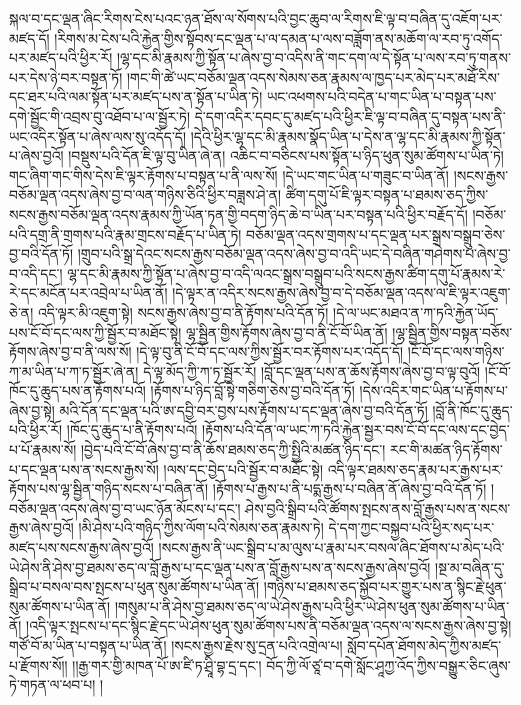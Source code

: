 སྐལ་བ་དང་ལྡན་ཞིང་རིགས་ངེས་པའང་ཉན་ཐོས་ལ་སོགས་པའི་བྱང་ཆུབ་ལ་རིགས་ཇི་ལྟ་བ་བཞིན་དུ་འཇོག་པར་མཛད་དོ། །རིགས་མ་ངེས་པའི་རྐྱེན་གྱིས་སྟོབས་དང་ལྡན་པ་ལ་དམན་པ་ལས་བཟློག་ནས་མཆོག་ལ་རབ་ཏུ་འགོད་པར་མཛད་པའི་ཕྱིར་རོ། །ལྷ་དང་མི་རྣམས་ཀྱི་སྟོན་པ་ཞེས་བྱ་བ་འདིས་ནི་གང་དག་ལ་དེ་སྟོན་པ་ལས་རབ་ཏུ་གནས་པར་དེས་ཉེ་བར་བསྟན་ཏོ། །གང་གི་ཚེ་ཡང་བཅོམ་ལྡན་འདས་སེམས་ཅན་རྣམས་ལ་ཁྱད་པར་མེད་པར་མཐོ་རིས་དང་ཐར་པའི་ལམ་སྟོན་པར་མཛད་པས་ན་སྟོན་པ་ཡིན་ཏེ། ཡང་འཕགས་པའི་བདེན་པ་གང་ཡིན་པ་བསྟན་པས་དགེ་སྦྱོང་གི་འབྲས་བུ་འཐོབ་པ་ལ་སྦྱོར་ཏེ། དེ་དག་འདིར་དབང་དུ་མཛད་པའི་ཕྱིར་ཇི་ལྟ་བ་བཞིན་དུ་བསྟན་པས་ནི་ཡང་འདིར་སྟོན་པ་ཞེས་ལས་སུ་འདོད་དོ། །དེའི་ཕྱིར་ལྷ་དང་མི་རྣམས་སྣོད་ཡིན་པ་དེས་ན་ལྷ་དང་མི་རྣམས་ཀྱི་སྟོན་པ་ཞེས་བྱའོ། །བསྡུས་པའི་དོན་ཇི་ལྟ་བུ་ཡིན་ཞེ་ན། འཆིང་བ་བཅིངས་པས་སྟོན་པ་ཉིད་ཕུན་སུམ་ཚོགས་པ་ཡིན་ཏེ། གང་ཞིག་གང་གིས་དེས་ཇི་ལྟར་རྟོགས་པ་བསྟན་པ་ནི་ལས་སོ། །དེ་ཡང་གང་ཡིན་པ་གཟུང་བ་ཡིན་ནོ། །སངས་རྒྱས་བཅོམ་ལྡན་འདས་ཞེས་བྱ་བ་ལན་གཉིས་ཅིའི་ཕྱིར་བཟླས་ཤེ་ན། ཚིག་དགུ་པོ་ཇི་ལྟར་བསྟན་པ་ཐམས་ཅད་ཀྱིས་སངས་རྒྱས་བཅོམ་ལྡན་འདས་རྣམས་ཀྱི་ཡོན་ཏན་གྱི་བདག་ཉིད་ཆེ་བ་ཡིན་པར་བསྟན་པའི་ཕྱིར་བརྗོད་དོ། །བཅོམ་པའི་དགྲ་ནི་གྲགས་པའི་རྣམ་གྲངས་བརྗོད་པ་ཡིན་ཏེ། བཅོམ་ལྡན་འདས་གྲགས་པ་དང་ལྡན་པར་སྒྲས་བསྒྲུབ་ཅེས་བྱ་བའི་དོན་ཏོ། །གྲུབ་པའི་སྒྲ་དེའང་སངས་རྒྱས་བཅོམ་ལྡན་འདས་ཞེས་བྱ་བ་འདི་ཡང་དེ་བཞིན་གཤེགས་པ་ཞེས་བྱ་བ་འདི་དང་། ལྷ་དང་མི་རྣམས་ཀྱི་སྟོན་པ་ཞེས་བྱ་བ་འདི་ལའང་སྒྲས་བསྒྲུབ་པའི་སངས་རྒྱས་ཚིག་དགུ་པོ་རྣམས་རེ་རེ་དང་མངོན་པར་འབྲེལ་པ་ཡིན་ནོ། །དེ་ལྟར་ན་འདིར་སངས་རྒྱས་ཞེས་བྱ་བ་དེ་བཅོམ་ལྡན་འདས་ལ་ཇི་ལྟར་འཇུག་ཅེ་ན། འདི་ལྟར་མི་འཇུག་སྟེ། སངས་རྒྱས་ཞེས་བྱ་བ་ནི་རྟོགས་པའི་དོན་ཏོ། །དེ་ལ་ཡང་མཐའ་ན་ཀ་ཏའི་རྐྱེན་ཡོད་པས་ངོ་བོ་དང་ལས་ཀྱི་སྦྱོར་བ་མཐོང་སྟེ། ལྷ་སྦྱིན་གྱིས་རྟོགས་ཞེས་བྱ་བ་ནི་ངོ་བོ་ཡིན་ནོ། །ལྷ་སྦྱིན་གྱིས་བསྟན་བཅོས་རྟོགས་ཞེས་བྱ་བ་ནི་ལས་སོ། །དེ་ལྟ་བུ་ནི་ངོ་བོ་དང་ལས་ཀྱིས་སྦྱོར་བར་རྟོགས་པར་འདོད་དོ། །ངོ་བོ་དང་ལས་གཉིས་ཀ་མ་ཡིན་པ་ཀ་ཏ་སྦྱོར་ཞེ་ན། དེ་ལྟ་མོད་ཀྱི་ཀ་ཏ་སྦྱོར་རོ། །བློ་དང་ལྡན་པས་ན་ཆོས་རྟོགས་ཞེས་བྱ་བ་ལྟ་བུའོ། །ངོ་བོ་ཁོང་དུ་ཆུད་པས་ན་རྟོགས་པའོ། །རྟོགས་པ་ཉིད་བློ་སྟེ་གཅིག་ཅེས་བྱ་བའི་དོན་ཏོ། །དེས་འདིར་གང་ཡིན་པ་རྟོགས་པ་ཞེས་བྱ་སྟེ། མའི་དོན་དང་ལྡན་པའི་ཨ་དབྱི་བར་བྱས་པས་རྟོགས་པ་དང་ལྡན་ཞེས་བྱ་བའི་དོན་ཏོ། །བློ་ནི་ཁོང་དུ་ཆུད་པའི་ཕྱིར་རོ། །ཁོང་དུ་ཆུད་པ་ནི་རྟོགས་པའོ། །རྟོགས་པའི་དོན་ལ་ཡང་ཀ་ཏའི་རྐྱེན་སྦྱར་བས་ངོ་བོ་དང་ལས་དང་བྱེད་པ་པོ་རྣམས་སོ། །བྱེད་པའི་ངོ་བོ་ཞེས་བྱ་བ་ནི་ཆོས་ཐམས་ཅད་ཀྱི་སྤྱིའི་མཚན་ཉིད་དང་། རང་གི་མཚན་ཉིད་རྟོགས་པ་དང་ལྡན་པས་ན་སངས་རྒྱས་སོ། །ལས་དང་བྱེད་པའི་སྦྱོར་བ་མཐོང་སྟེ། འདི་ལྟར་ཐམས་ཅད་རྣམ་པར་རྒྱས་པར་རྟོགས་པས་ལྷ་སྦྱིན་གཉིད་སངས་པ་བཞིན་ནོ། །རྟོགས་པ་རྒྱས་པ་ནི་པདྨ་རྒྱས་པ་བཞིན་ནོ་ཞེས་བྱ་བའི་དོན་ཏོ། །བཅོམ་ལྡན་འདས་ཞེས་བྱ་བ་ཡང་ཉོན་མོངས་པ་དང་། ཤེས་བྱའི་སྒྲིབ་པའི་ཚོགས་སྤངས་ནས་བློ་རྒྱས་པས་ན་སངས་རྒྱས་ཞེས་བྱའོ། །མི་ཤེས་པའི་གཉིད་ཀྱིས་ལོག་པའི་སེམས་ཅན་རྣམས་ཏེ། དེ་དག་ཀྱང་བསྐྱབ་པའི་ཕྱིར་སད་པར་མཛད་པས་སངས་རྒྱས་ཞེས་བྱའོ། །སངས་རྒྱས་ནི་ཡང་སྒྲིབ་པ་མ་ལུས་པ་རྣམ་པར་བསལ་ཞིང་ཐོགས་པ་མེད་པའི་ཡེ་ཤེས་ནི་ཤེས་བྱ་ཐམས་ཅད་ལ་བློ་རྒྱས་པ་དང་ལྡན་པས་ན་བློ་རྒྱས་པས་ན་སངས་རྒྱས་ཞེས་བྱའོ། །སྔ་མ་བཞིན་དུ་སྒྲིབ་པ་བསལ་བས་སྤངས་པ་ཕུན་སུམ་ཚོགས་པ་ཡིན་ནོ། །གཉིས་པ་ཐམས་ཅད་སྐྱོབ་པར་གྱུར་པས་ན་སྙིང་རྗེ་ཕུན་སུམ་ཚོགས་པ་ཡིན་ནོ། །གསུམ་པ་ནི་ཤེས་བྱ་ཐམས་ཅད་ལ་ཡེ་ཤེས་རྒྱས་པའི་ཕྱིར་ཡེ་ཤེས་ཕུན་སུམ་ཚོགས་པ་ཡིན་ནོ། །འདི་ལྟར་སྤངས་པ་དང་སྙིང་རྗེ་དང་ཡེ་ཤེས་ཕུན་སུམ་ཚོགས་པས་ནི་བཅོམ་ལྡན་འདས་ལ་སངས་རྒྱས་ཞེས་བྱ་སྟེ། གཙོ་བོ་མ་ཡིན་པ་བསྟན་པ་ཡིན་ནོ། །སངས་རྒྱས་རྗེས་སུ་དྲན་པའི་འགྲེལ་པ། སློབ་དཔོན་ཐོགས་མེད་ཀྱིས་མཛད་པ་རྫོགས་སོ།། །།རྒྱ་གར་གྱི་མཁན་པོ་ཨ་ཛི་ཏ་ཤྲཱི་བྷ་དྲ་དང་། བོད་ཀྱི་ལོ་ཙཱ་བ་དགེ་སློང་ཤཱཀྱ་འོད་ཀྱིས་བསྒྱུར་ཅིང་ཞུས་ཏེ་གཏན་ལ་ཕབ་པ། །